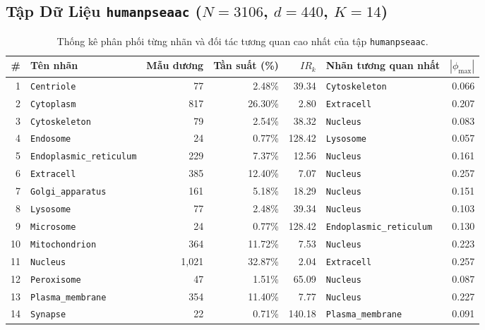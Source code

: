 \documentclass[11pt,a4paper]{article}
\begin{document}
\subsection{Tập Dữ Liệu \texttt{humanpseaac} ($N=3106$, $d=440$, $K=14$)}
\begin{table}[htbp]
\centering
\footnotesize
\caption{Thống kê phân phối từng nhãn và đối tác tương quan cao nhất của tập \texttt{humanpseaac}.}
\begin{tabularx}{0.95\textwidth}{r l r r r l r}
\toprule
\textbf{\#} & \textbf{Tên nhãn} & \textbf{Mẫu dương} & \textbf{Tần suất (\%)} & \textbf{$IR_k$} & \textbf{Nhãn tương quan nhất} & \textbf{$|\phi_{\max}|$} \\
\midrule
1 & \texttt{Centriole} & 77 & 2.48\% & 39.34 & \texttt{Cytoskeleton} & 0.066 \\
2 & \texttt{Cytoplasm} & 817 & 26.30\% & 2.80 & \texttt{Extracell} & 0.207 \\
3 & \texttt{Cytoskeleton} & 79 & 2.54\% & 38.32 & \texttt{Nucleus} & 0.083 \\
4 & \texttt{Endosome} & 24 & 0.77\% & 128.42 & \texttt{Lysosome} & 0.057 \\
5 & \texttt{Endoplasmic\_reticulum} & 229 & 7.37\% & 12.56 & \texttt{Nucleus} & 0.161 \\
6 & \texttt{Extracell} & 385 & 12.40\% & 7.07 & \texttt{Nucleus} & 0.257 \\
7 & \texttt{Golgi\_apparatus} & 161 & 5.18\% & 18.29 & \texttt{Nucleus} & 0.151 \\
8 & \texttt{Lysosome} & 77 & 2.48\% & 39.34 & \texttt{Nucleus} & 0.103 \\
9 & \texttt{Microsome} & 24 & 0.77\% & 128.42 & \texttt{Endoplasmic\_reticulum} & 0.130 \\
10 & \texttt{Mitochondrion} & 364 & 11.72\% & 7.53 & \texttt{Nucleus} & 0.223 \\
11 & \texttt{Nucleus} & 1,021 & 32.87\% & 2.04 & \texttt{Extracell} & 0.257 \\
12 & \texttt{Peroxisome} & 47 & 1.51\% & 65.09 & \texttt{Nucleus} & 0.087 \\
13 & \texttt{Plasma\_membrane} & 354 & 11.40\% & 7.77 & \texttt{Nucleus} & 0.227 \\
14 & \texttt{Synapse} & 22 & 0.71\% & 140.18 & \texttt{Plasma\_membrane} & 0.091 \\
\bottomrule
\end{tabularx}
\end{table}
\end{document}
